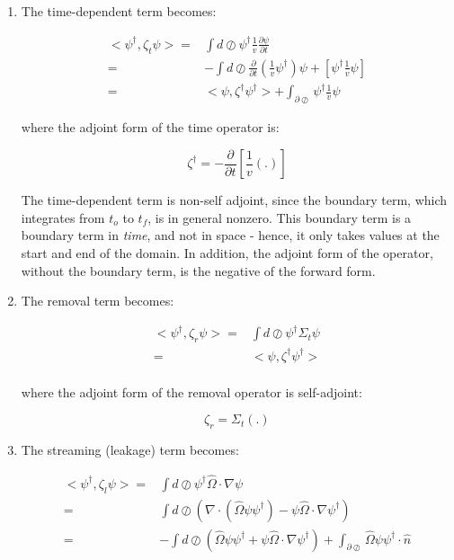 \documentclass[10pt]{article}
\begin{document}
\begin{flushleft}
\begin{enumerate}
\item The time-dependent term becomes:

\begin{equation}
\label{eq:AdjointTime}
\begin{aligned}
<\psi^\dagger, \zeta_t\psi> = & \int d\oslash \psi^\dagger \frac{1}{v} \frac{\partial\psi}{\partial t}\\
= & -\int d\oslash \frac{\partial}{\partial t} \left(\frac{1}{v}\psi^\dagger\right)\psi + [\psi^\dagger \frac{1}{v} \psi]\\
= & <\psi, \zeta^\dagger\psi^\dagger> + \int_{\partial\oslash}\psi^\dagger \frac{1}{v} \psi
\end{aligned}
\end{equation}

where the adjoint form of the time operator is:

\begin{equation}
\zeta^\dagger = -\frac{\partial}{\partial t}\left\lbrack\frac{1}{v}(.)\right\rbrack
\end{equation}

The time-dependent term is non-self adjoint, since the boundary term, which integrates from \(t_o\) to \(t_f\), is in general nonzero. This boundary term is a boundary term in \textit{time}, and not in space - hence, it only takes values at the start and end of the domain. In addition, the adjoint form of the operator, without the boundary term, is the negative of the forward form. 

\item The removal term becomes:

\begin{equation}
\begin{aligned}
<\psi^\dagger,\zeta_r\psi>= & \int d\oslash \psi^\dagger \Sigma_t\psi\\
= & <\psi,\zeta^\dagger\psi^\dagger>\\
\end{aligned}
\end{equation}

where the adjoint form of the removal operator is self-adjoint:

\begin{equation}
\zeta_r=\Sigma_t(.)
\end{equation}

\item The streaming (leakage) term becomes:

\begin{equation}
\begin{aligned}
<\psi^\dagger,\zeta_l\psi>= & \int d\oslash \psi^\dagger\hat{\Omega}\cdot\nabla\psi\\
= & \int d\oslash \left(\nabla\cdot(\hat{\Omega}\psi\psi^\dagger)-\psi\hat{\Omega}\cdot\nabla\psi^\dagger\right)\\
= & -\int d\oslash \left(\hat{\Omega}\psi\psi^\dagger +\psi\hat{\Omega}\cdot\nabla\psi^\dagger\right)+ \int_{\partial\oslash}\hat{\Omega}\psi\psi^\dagger\cdot\hat{n}\\
\end{aligned}
\end{equation}


\end{enumerate}
\end{flushleft}
\end{document}
